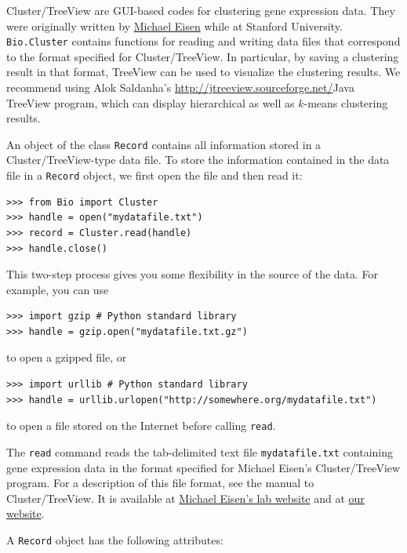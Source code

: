 \documentclass{report}
\begin{document}
Cluster/TreeView are GUI-based codes for clustering gene expression data. They were originally written by \href{http://rana.lbl.gov}{Michael Eisen} while at Stanford University. \verb|Bio.Cluster| contains functions for reading and writing data files that correspond to the format specified for Cluster/TreeView. In particular, by saving a clustering result in that format, TreeView can be used to visualize the clustering results. We recommend using Alok Saldanha's \url{http://jtreeview.sourceforge.net/}{Java TreeView program}, which can display hierarchical as well as $k$-means clustering results.

An object of the class \verb|Record| contains all information stored in a Cluster/TreeView-type data file. To store the information contained in the data file in a \verb|Record| object, we first open the file and then read it:

\begin{verbatim}
>>> from Bio import Cluster
>>> handle = open("mydatafile.txt")
>>> record = Cluster.read(handle)
>>> handle.close()
\end{verbatim}
This two-step process gives you some flexibility in the source of the data.
For example, you can use

\begin{verbatim}
>>> import gzip # Python standard library
>>> handle = gzip.open("mydatafile.txt.gz")
\end{verbatim}
to open a gzipped file, or
\begin{verbatim}
>>> import urllib # Python standard library
>>> handle = urllib.urlopen("http://somewhere.org/mydatafile.txt")
\end{verbatim}
to open a file stored on the Internet before calling \verb|read|.

The \verb|read| command reads the tab-delimited text file \verb|mydatafile.txt| containing gene expression data in the format specified for Michael Eisen's Cluster/TreeView program. For a description of this file format, see the manual to Cluster/TreeView. It is available at \href{http://rana.lbl.gov/manuals/ClusterTreeView.pdf}{Michael Eisen's lab website} and at \href{http://bonsai.ims.u-tokyo.ac.jp/~mdehoon/software/cluster/cluster3.pdf}{our website}.

A \verb|Record| object has the following attributes:
\end{document}
